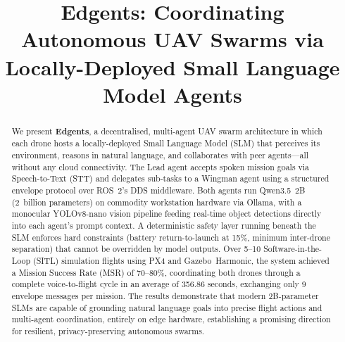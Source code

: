 \documentclass[conference]{IEEEtran}
\begin{document}
\title{Edgents: Coordinating Autonomous UAV Swarms via\\Locally-Deployed Small Language Model Agents}

\author{
\and
{}
}

\maketitle
\thispagestyle{plain}
\pagestyle{plain}

\begin{abstract}
We present \textbf{Edgents}, a decentralised, multi-agent UAV swarm architecture in which each drone hosts a locally-deployed Small Language Model (SLM) that perceives its environment, reasons in natural language, and collaborates with peer agents—all without any cloud connectivity. The Lead agent accepts spoken mission goals via Speech-to-Text (STT) and delegates sub-tasks to a Wingman agent using a structured envelope protocol over ROS~2's DDS middleware. Both agents run Qwen3.5~2B (2~billion parameters) on commodity workstation hardware via Ollama, with a monocular YOLOv8-nano vision pipeline feeding real-time object detections directly into each agent's prompt context. A deterministic safety layer running beneath the SLM enforces hard constraints (battery return-to-launch at 15\%, minimum inter-drone separation) that cannot be overridden by model outputs. Over 5–10 Software-in-the-Loop (SITL) simulation flights using PX4 and Gazebo~Harmonic, the system achieved a Mission Success Rate (MSR) of 70–80\%, coordinating both drones through a complete voice-to-flight cycle in an average of 356.86 seconds, exchanging only 9 envelope messages per mission. The results demonstrate that modern 2B-parameter SLMs are capable of grounding natural language goals into precise flight actions and multi-agent coordination, entirely on edge hardware, establishing a promising direction for resilient, privacy-preserving autonomous swarms.
\end{abstract}
\end{document}
